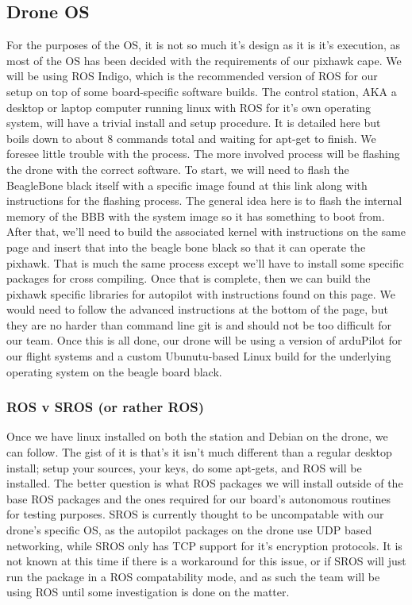 \documentclass[IEEEtran,letterpaper,10pt,notitlepage,draftclsnofoot,onecolumn]{article}
\begin{document}
\subsection{Drone OS}
For the purposes of the OS, it is not so much it's design as it is it's execution, as most of the OS has been decided with
the requirements of our pixhawk cape. We will be using ROS Indigo, which is the recommended version of ROS for our setup on top 
of some board-specific software builds. The control station, AKA a desktop or laptop computer running linux with ROS for it's own 
operating system, will have a trivial install and setup procedure. It is detailed here\cite{Indigo} but boils down to about 8 
commands total and waiting for apt-get to finish. We foresee little trouble with the process. The more involved process will be 
flashing the drone with the correct software. To start, we will need to flash the BeagleBone black itself with a specific image 
found at this link along with instructions for the flashing process\cite{buildingBBB}. The general idea here is to flash the internal
memory of the BBB with the system image so it has something to boot from. After that, we'll need to build the associated kernel 
with instructions on the same page and insert that into the beagle bone black so that it can operate the pixhawk. That is much 
the same process except we'll have to install some specific packages for cross compiling. Once that is complete, then we can 
build the pixhawk specific libraries for autopilot with instructions found on this page\cite{buildingPX}. We would need to 
follow the advanced instructions at the bottom of the page, but they are no harder than command line git is and should not be 
too difficult for our team. Once this is all done, our drone will be using a version of arduPilot for our flight systems and a 
custom Ubunutu-based Linux build for the underlying operating system on the beagle board black.

\subsubsection{ROS v SROS (or rather ROS)}
Once we have linux installed on both the station and Debian on the drone, we can follow\cite{Indigo}.
The gist of it is that's it isn't much different than a regular desktop install; setup your sources, your keys, do some 
apt-gets, and ROS will be installed. The better question is what ROS packages we will install outside of the base ROS packages
and the ones required for our board's autonomous routines for testing purposes. SROS is currently thought to be uncompatable with
our drone's specific OS, as the autopilot packages on the drone use UDP based networking, while SROS only has TCP support for 
it's encryption protocols. It is not known at this time if there is a workaround for this issue, or if SROS will just run the 
package in a ROS compatability mode, and as such the team will be using ROS until some investigation is done on the matter.
\end{document}
